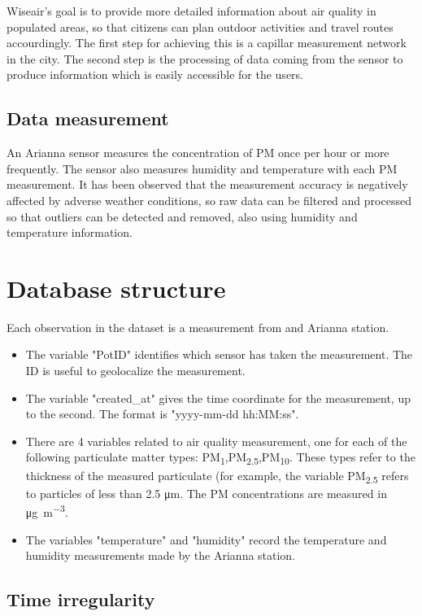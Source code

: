 \documentclass{article}
\begin{document}
Wiseair's goal is to provide more detailed information about air quality in populated areas, so that citizens can plan outdoor activities and travel routes 
accourdingly. The first step for achieving this is a capillar measurement network in the city. The second step is the processing of data coming from the sensor
to produce information which is easily accessible for the users. 


\subsection{Data measurement}

An Arianna sensor measures the concentration of PM once per hour or more frequently. The sensor also measures humidity and 
temperature with each PM measurement. It has been observed that the measurement accuracy is negatively affected by adverse weather
 conditions, so raw data can be filtered and processed so that outliers can be detected and removed, also using humidity and temperature information.

\section{Database structure}

Each observation in the dataset is a measurement from and Arianna station. 
\begin{itemize}
    \item  The variable "PotID" identifies which sensor has taken the measurement. The ID is useful to geolocalize the measurement.
    \item The variable "created\_at" gives the time coordinate for the measurement, up to the second. The format is "yyyy-mm-dd hh:MM:ss".
    \item There are 4 variables related to air quality measurement, one for each of the following particulate matter types:
    PM\textsubscript{1},PM\textsubscript{2.5},PM\textsubscript{10}. These types refer to the thickness of the measured
    particulate (for example, the variable PM\textsubscript{2.5} refers to particles of less than 2.5 \si{\micro\meter}. The
    PM concentrations are measured in \si{\micro\gram\per\cubic\meter}.
    \item The variables "temperature" and "humidity" record the temperature and humidity measurements made by the Arianna station.
\end{itemize}

\subsection{Time irregularity}
\end{document}

